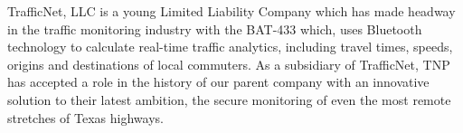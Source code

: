 TrafficNet, LLC is a young Limited Liability Company which has made headway in the traffic monitoring industry with the BAT-433 which, uses Bluetooth technology to calculate real-time traffic analytics, including travel times, speeds, origins and destinations of local commuters. As a subsidiary of TrafficNet, TNP has accepted a role in the history of our parent company with an innovative solution to their latest ambition, the secure monitoring of even the most remote stretches of Texas highways. 
